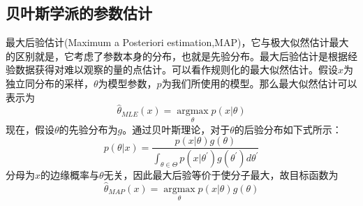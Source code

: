 \subsection*{贝叶斯学派的参数估计}
最大后验估计(Maximum a Posteriori estimation,MAP)，它与极大似然估计最大的区别就是，它考虑了参数本身的分布，也就是先验分布。最大后验估计是根据经验数据获得对难以观察的量的点估计。可以看作规则化的最大似然估计。假设$x$为独立同分布的采样，$\theta$为模型参数，$p$为我们所使用的模型。那么最大似然估计可以表示为
\begin{equation}
	\hat{\theta}_{MLE}(x)=\mathop{argmax}\limits_\theta p(x|\theta)
\end{equation}
现在，假设$\theta$的先验分布为$g$。通过贝叶斯理论，对于$\theta$的后验分布如下式所示：
\begin{equation}
	p(\theta|x)=\frac{p(x|\theta)g(\theta)}{\int_{\theta \in \Theta}p(x|\theta^{'})g(\theta^{'})d\theta^{'}}
\end{equation}
分母为$x$的边缘概率与$\theta$无关，因此最大后验等价于使分子最大，故目标函数为
\begin{equation}
	\hat{\theta}_{MAP}(x)=\mathop{argmax}\limits_\theta p(x|\theta)g(\theta)
\end{equation}